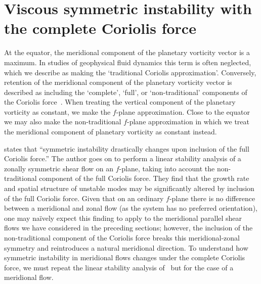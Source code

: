 \section{Viscous symmetric instability with the complete Coriolis force}
\label{sec:DrasticSI}
    At the equator, the meridional component of the planetary vorticity vector is a maximum. In studies of geophysical fluid dynamics this term is often neglected, which we describe as making the `traditional Coriolis approximation'. Conversely, retention of the meridional component of the planetary vorticity vector is described as including the `complete', `full', or `non-traditional' components of the Coriolis force~\citep{Stewart2011}. When treating the vertical component of the planetary vorticity as constant, we make the $f$-plane approximation. Close to the equator we may also make the non-traditional $f$-plane approximation in which we treat the meridional component of planetary vorticity as constant instead.

    \citet{Zeitlin2018a} states that ``symmetric instability drastically changes upon inclusion of the full Coriolis force.'' The author goes on to perform a linear stability analysis of a zonally symmetric shear flow on an $f$-plane, taking into account the non-traditional component of the full Coriolis force. They find that the growth rate and spatial structure of unstable modes may be significantly altered by inclusion of the full Coriolis force. Given that on an ordinary $f$-plane there is no difference between a meridional and zonal flow (as the system has no preferred orientation), one may na\"ively expect this finding to apply to the meridional parallel shear flows we have considered in the preceding sections; however, the inclusion of the non-traditional component of the Coriolis force breaks this meridional-zonal symmetry and reintroduces a natural meridional direction. To understand how symmetric instability in meridional flows changes under the complete Coriolis force, we must repeat the linear stability analysis of~\citet{Zeitlin2018a} but for the case of a meridional flow.

